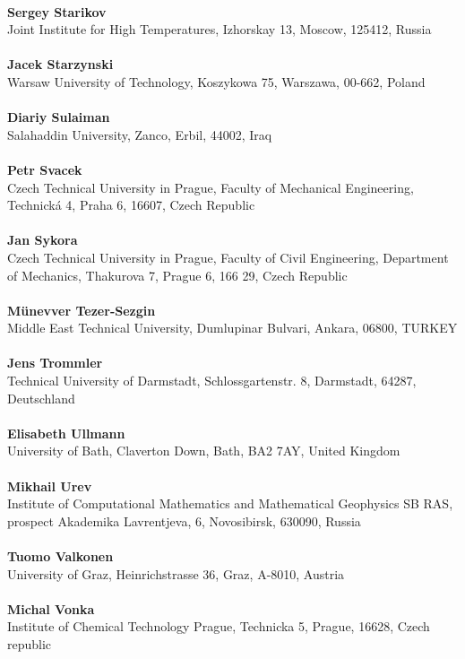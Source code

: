 \\ 
\textbf{Sergey Starikov}
\\ 
Joint Institute for High Temperatures, Izhorskay 13, Moscow, 125412, Russia\\ 
\\ 
\textbf{Jacek Starzynski}
\\ 
Warsaw University of Technology, Koszykowa 75, Warszawa, 00-662, Poland\\ 
\\ 
\textbf{Diariy Sulaiman}
\\ 
Salahaddin University, Zanco, Erbil, 44002, Iraq\\ 
\\ 
\textbf{Petr Svacek}
\\ 
Czech Technical University in Prague, Faculty of Mechanical Engineering, Technick\'a 4, Praha 6, 16607, Czech Republic\\ 
\\ 
\textbf{Jan Sykora}
\\ 
Czech Technical University in Prague, Faculty of Civil Engineering, Department of Mechanics, Thakurova 7, Prague 6, 166 29, Czech Republic\\ 
\\ 
\textbf{M\"unevver Tezer-Sezgin}
\\ 
Middle East Technical University, Dumlupinar Bulvari, Ankara, 06800, TURKEY\\ 
\\ 
\textbf{Jens Trommler}
\\ 
Technical University of Darmstadt, Schlossgartenstr. 8, Darmstadt, 64287, Deutschland\\ 
\\ 
\textbf{Elisabeth Ullmann}
\\ 
University of Bath, Claverton Down, Bath, BA2 7AY, United Kingdom\\ 
\\ 
\textbf{Mikhail Urev}
\\ 
Institute of Computational Mathematics and Mathematical Geophysics SB RAS, prospect Akademika Lavrentjeva, 6, Novosibirsk, 630090, Russia\\ 
\\ 
\textbf{Tuomo Valkonen}
\\ 
University of Graz, Heinrichstrasse 36, Graz, A-8010, Austria\\ 
\\ 
\textbf{Michal Vonka}
\\ 
Institute of Chemical Technology Prague, Technicka 5, Prague, 16628, Czech republic\\ 
